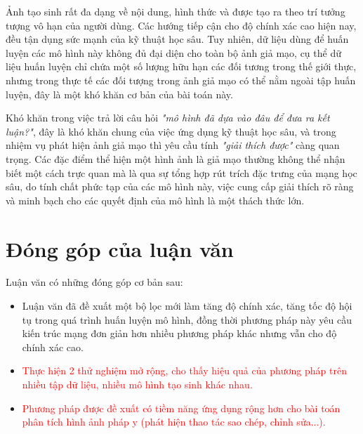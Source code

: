 %
Ảnh tạo sinh rất đa dạng về nội dung, hình thức và được tạo ra theo trí tưởng tượng vô hạn của người dùng. Các hướng tiếp cận cho độ chính xác cao hiện nay, đều tận dụng sức mạnh của kỹ thuật học sâu. Tuy nhiên, dữ liệu dùng để huấn luyện các mô hình này không đủ đại diện cho toàn bộ ảnh giả mạo, cụ thể dữ liệu huấn luyện chỉ chứa một số lượng hữu hạn các đối tương trong thế giới thực, nhưng trong thực tế các đối tượng trong ảnh giả mạo có thể nằm ngoài tập huấn luyện, đây là một khó khăn cơ bản của bài toán này.

Khó khăn trong việc trả lời câu hỏi \textit{"mô hình đã dựa vào đâu để đưa ra kết luận?"}, đây là khó khăn chung của việc ứng dụng kỹ thuật học sâu, và trong nhiệm vụ phát hiện ảnh giả mạo thì yêu cầu tính \textit{"giải thích được"} càng quan trọng. Các đặc điểm thể hiện một hình ảnh là giả mạo thường không thể nhận biết một cách trực quan mà là qua sự tổng hợp rút trích đặc trưng của mạng học sâu, do tính chất phức tạp của các mô hình này, việc cung cấp giải thích rõ ràng và minh bạch cho các quyết định của mô hình là một thách thức lớn.

\section{Đóng góp của luận văn}
Luận văn có những đóng góp cơ bản sau:
\begin{itemize}
	\item Luận văn đã đề xuất một bộ lọc mới làm tăng độ chính xác, tăng tốc độ hội tụ trong quá trình huấn luyện mô hình, đồng thời phương pháp này yêu cầu kiến trúc mạng đơn giản hơn nhiều phương pháp khác nhưng vẫn cho độ chính xác cao.
	\item \textcolor{red}{Thực hiện 2 thử nghiệm mở rộng, cho thấy hiệu quả của phương pháp trên nhiều tập dữ liệu, nhiều mô hình tạo sinh khác nhau.}
	\item \textcolor{red}{Phương pháp được đề xuất có tiềm năng ứng dụng rộng hơn cho bài toán phân tích hình ảnh pháp y (phát hiện thao tác sao chép, chỉnh sửa...).}
\end{itemize}









